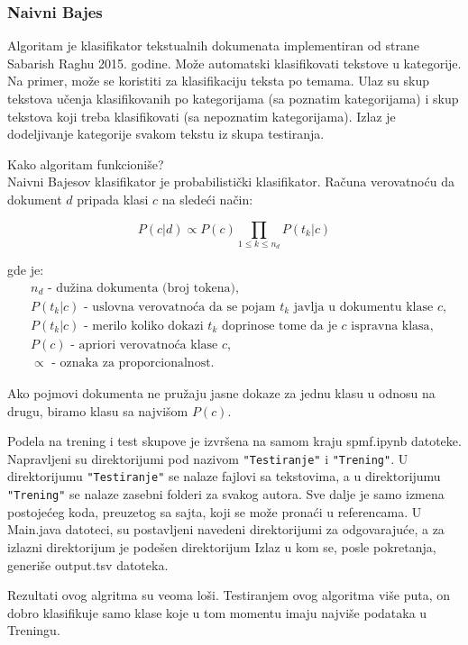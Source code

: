\documentclass{article}
\begin{document}
\subsubsection{Naivni Bajes}
\begin{flushleft}

Algoritam je klasifikator tekstualnih dokumenata implementiran od strane Sabarish Raghu 2015. godine. Može automatski klasifikovati tekstove u kategorije. Na primer, može se koristiti za klasifikaciju teksta po temama. Ulaz su skup tekstova učenja klasifikovanih po kategorijama (sa poznatim kategorijama) i skup tekstova koji treba klasifikovati (sa nepoznatim kategorijama). Izlaz je dodeljivanje kategorije svakom tekstu iz skupa testiranja. \\
\vspace{2mm}

Kako algoritam funkcioniše?\\
Naivni Bajesov klasifikator je probabilistički klasifikator. Računa verovatnoću da dokument \( d \) pripada klasi \( c \) na sledeći način:

\[
P(c|d) \propto P(c) \prod_{1 \leq k \leq n_d} P(t_k | c)
\]

gde je:
\begin{align*}
& n_d \text{ - dužina dokumenta (broj tokena)}, \\
& P(t_k | c) \text{ - uslovna verovatnoća da se pojam } t_k \text{ javlja u dokumentu klase } c, \\
& P(t_k | c) \text{ - merilo koliko dokazi } t_k \text{ doprinose tome da je } c \text{ ispravna klasa}, \\
& P(c) \text{ - apriori verovatnoća klase } c, \\
& \propto \text{ - oznaka za proporcionalnost}.
\end{align*}

Ako pojmovi dokumenta ne pružaju jasne dokaze za jednu klasu u odnosu na drugu, biramo klasu sa najvišom \( P(c) \).


\vspace{4mm}

Podela na trening i test skupove je izvršena na samom kraju spmf.ipynb datoteke. Napravljeni su direktorijumi pod nazivom \verb|"Testiranje"| i \verb|"Trening"|. U direktorijumu \verb|"Testiranje"| se nalaze fajlovi sa tekstovima, a u direktorijumu \verb|"Trening"| se nalaze zasebni folderi za svakog autora. 
Sve dalje je samo izmena postojećeg koda, preuzetog sa sajta, koji se može pronaći u referencama. U Main.java datoteci, su postavljeni navedeni direktorijumi za odgovarajuće, a za izlazni direktorijum je podešen direktorijum Izlaz u kom se, posle pokretanja, generiše output.tsv datoteka.
\vspace{2mm}

Rezultati ovog algritma su veoma loši. Testiranjem ovog algoritma više puta, on dobro klasifikuje samo klase koje u tom momentu imaju najviše podataka u Treningu.

\end{flushleft}
\end{document}
